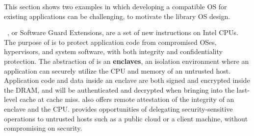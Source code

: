 




This section shows two examples in which developing a compatible OS for existing applications can be challenging, to motivate the library OS design.


\label{sec:intro:sgx}


\sgx{}~\cite{intelsgx}, or Software Guard Extensions, are a set of new instructions on Intel CPUs.
The purpose of \sgx{}
is to protect application code from compromised OSes, hypervisors, and system software,
with both integrity and confidentiality protection.
The abstraction of \sgx{} is 
an {\bf enclaves}, 
an isolation environment where an application can securely
utilize the CPU and memory
of an untrusted host.
Application code and data inside an enclave are both signed and encrypted
inside the DRAM,
and will be authenticated and decrypted
when bringing into the last-level cache at cache miss.
\sgx{} also offers remote attestation of the integrity of an enclave
and the CPU.
\sgx{} provides opportunities of delegating security-sensitive operations
to untrusted hosts such as a public cloud
or a client machine,
without compromising on security.



